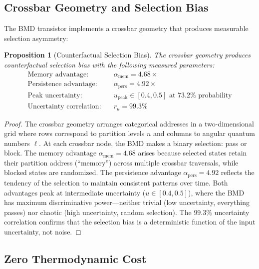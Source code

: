 \documentclass[twocolumn,10pt,a4paper]{article}
\newtheorem{proposition}[theorem]{Proposition}
\theoremstyle{definition}
\theoremstyle{remark}
\begin{document}
\subsection{Crossbar Geometry and Selection Bias}

The BMD transistor implements a crossbar geometry that produces measurable selection asymmetry:

\begin{proposition}[Counterfactual Selection Bias]
\label{prop:crossbar}
The crossbar geometry produces counterfactual selection bias with the following measured parameters:
\begin{align}
\text{Memory advantage:} &\quad \alpha_{\mathrm{mem}} = 4.68\times \label{eq:memory_advantage} \\
\text{Persistence advantage:} &\quad \alpha_{\mathrm{pers}} = 4.92\times \label{eq:persistence_advantage} \\
\text{Peak uncertainty:} &\quad u_{\mathrm{peak}} \in [0.4, 0.5] \text{ at } 73.2\% \text{ probability} \label{eq:peak_uncertainty} \\
\text{Uncertainty correlation:} &\quad r_u = 99.3\% \label{eq:uncertainty_corr}
\end{align}
\end{proposition}

\begin{proof}
The crossbar geometry arranges categorical addresses in a two-dimensional grid where rows correspond to partition levels $n$ and columns to angular quantum numbers $\ell$. At each crossbar node, the BMD makes a binary selection: pass or block. The memory advantage $\alpha_{\mathrm{mem}} = 4.68$ arises because selected states retain their partition address (``memory'') across multiple crossbar traversals, while blocked states are randomized. The persistence advantage $\alpha_{\mathrm{pers}} = 4.92$ reflects the tendency of the selection to maintain consistent patterns over time. Both advantages peak at intermediate uncertainty ($u \in [0.4, 0.5]$), where the BMD has maximum discriminative power---neither trivial (low uncertainty, everything passes) nor chaotic (high uncertainty, random selection). The $99.3\%$ uncertainty correlation confirms that the selection bias is a deterministic function of the input uncertainty, not noise. \qedhere
\end{proof}

\subsection{Zero Thermodynamic Cost}
\end{document}
